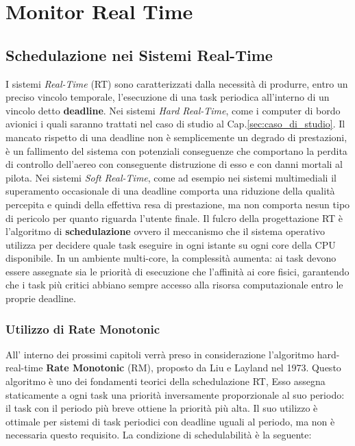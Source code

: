 \chapter{Monitor Real Time}
\label{ch:introduzione}
\label{sec:fly-by-wire}
\section{Schedulazione nei Sistemi Real-Time}
I sistemi \textit{Real-Time} (RT) sono caratterizzati dalla necessità di produrre, entro un preciso vincolo temporale, l'esecuzione di una task periodica all'interno di un vincolo detto
\textbf{deadline}. Nei sistemi \textit{Hard Real-Time}, come i computer di bordo avionici i quali saranno trattati nel caso di studio al Cap.\ref{sec:caso_di_studio}. 
Il mancato rispetto di una deadline non è semplicemente un degrado di prestazioni, è un fallimento del sistema con potenziali conseguenze che comportano la perdita di controllo dell'aereo con conseguente distruzione di esso e con danni mortali al pilota. Nei sistemi \textit{Soft Real-Time}, come ad esempio nei sistemi multimediali il superamento occasionale di una deadline comporta una riduzione della qualità percepita e quindi della effettiva resa di prestazione, ma non comporta nesun tipo di pericolo per quanto riguarda l'utente finale. Il fulcro della progettazione RT è l'algoritmo di \textbf{schedulazione} ovvero il meccanismo che il sistema operativo utilizza per decidere quale task eseguire in ogni istante su ogni core della CPU disponibile. In un ambiente multi-core, la complessità aumenta: ai task devono essere assegnate sia le priorità di esecuzione che l'affinità ai core fisici, garantendo che i task più critici abbiano sempre accesso alla risorsa computazionale entro le proprie deadline.
\clearpage
\subsection{Utilizzo di Rate Monotonic} All' interno dei prossimi capitoli verrà preso in considerazione l'algoritmo hard-real-time \textbf{Rate Monotonic} (RM), proposto da Liu e Layland nel 1973. Questo algoritmo è uno dei fondamenti teorici della schedulazione RT, Esso assegna staticamente a ogni task una priorità inversamente proporzionale al suo periodo: il task con il periodo più breve ottiene la priorità più alta. Il suo utilizzo è ottimale per sistemi di task periodici con deadline uguali al periodo, ma non è necessaria questo requisito. La condizione di schedulabilità è la seguente:

